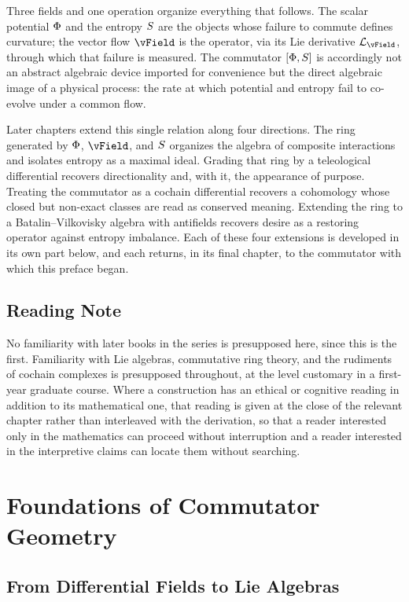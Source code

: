 Three fields and one operation organize everything that follows. The scalar potential $\Phi$ and the entropy $S$ are the objects whose failure to commute defines curvature; the vector flow $\vField$ is the operator, via its Lie derivative $\mathcal{L}_{\vField}$, through which that failure is measured. The commutator $[\Phi, S]$ is accordingly not an abstract algebraic device imported for convenience but the direct algebraic image of a physical process: the rate at which potential and entropy fail to co-evolve under a common flow.

Later chapters extend this single relation along four directions. The ring generated by $\Phi$, $\vField$, and $S$ organizes the algebra of composite interactions and isolates entropy as a maximal ideal. Grading that ring by a teleological differential recovers directionality and, with it, the appearance of purpose. Treating the commutator as a cochain differential recovers a cohomology whose closed but non-exact classes are read as conserved meaning. Extending the ring to a Batalin--Vilkovisky algebra with antifields recovers desire as a restoring operator against entropy imbalance. Each of these four extensions is developed in its own part below, and each returns, in its final chapter, to the commutator with which this preface began.

\chapter*{Reading Note}

No familiarity with later books in the series is presupposed here, since this is the first. Familiarity with Lie algebras, commutative ring theory, and the rudiments of cochain complexes is presupposed throughout, at the level customary in a first-year graduate course. Where a construction has an ethical or cognitive reading in addition to its mathematical one, that reading is given at the close of the relevant chapter rather than interleaved with the derivation, so that a reader interested only in the mathematics can proceed without interruption and a reader interested in the interpretive claims can locate them without searching.

\part{Foundations of Commutator Geometry}

\chapter{From Differential Fields to Lie Algebras}

